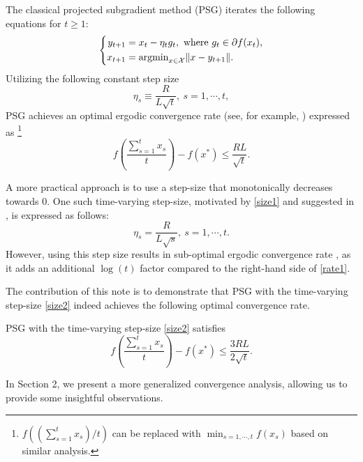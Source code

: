 The classical projected subgradient method (PSG) iterates the following equations for $t\ge 1$:
\begin{equation*}
\left\{	\begin{aligned}
		y_{t+1}&=x_t-\eta_t g_t, ~\text{where } g_t\in\partial f(x_t),\\
		x_{t+1}&=  {\rm argmin}_{x\in\mathcal{X}}\Vert x-y_{t+1} \Vert.	\end{aligned} \right.
\end{equation*}
Utilizing  the following constant step size
	\begin{equation}
		\eta_s\equiv\frac{R}{L\sqrt{t}}, ~s=1,\cdots,t,  \label{size1}
	\end{equation}	
PSG achieves an optimal ergodic convergence rate (see, for example, \cite{nesterov2018lectures,bubeck2015convex,MITlecture}) expressed as \footnote{ $f ((\sum_{s=1}^t x_s)/t)$ can be replaced with $\min_{s=1,\cdots,t}f(x_s)$ based on similar analysis.}
\begin{equation}
		f\left(\frac{\sum_{s=1}^t x_s}{t}\right)-f(x^*)\le \frac{RL}{\sqrt{t}}. \label{rate1}
\end{equation}

A more practical approach is to use a step-size that monotonically decreases towards $0$.
One such time-varying step-size, motivated by \eqref{size1} and suggested in \cite{nesterov2018lectures,bubeck2015convex}, is expressed as follows:
\begin{equation}
	\eta_s=\frac{R}{L\sqrt{s}},~s=1,\cdots,t.\label{size2}
\end{equation}
However, using this step size results in sub-optimal ergodic convergence rate \cite{nesterov2018lectures,bubeck2015convex}, as it adds an additional $\log(t)$ factor compared to the right-hand side of \eqref{rate1}.


The contribution of this note is to demonstrate that PSG with the time-varying step-size \eqref{size2} indeed achieves the following optimal convergence rate.
\begin{theorem} \label{main}
PSG with the time-varying step-size \eqref{size2} satisfies
 \begin{equation*}
	f\left(\frac{\sum_{s=1}^t x_s}{t}\right)-f(x^*)\le \frac{3RL}{2\sqrt{t}}.
\end{equation*}
 \end{theorem}
In Section 2, we present a more generalized convergence analysis, allowing us to provide some insightful observations.

